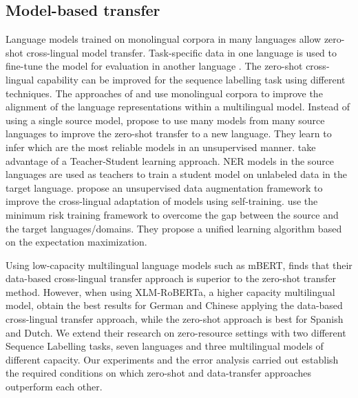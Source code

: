 \documentclass[11pt]{article}
\newcommand{\comment}[1]{#1}
\begin{document}
\subsection{Model-based transfer}
\label{subsec:model_transfer}
Language models trained on monolingual corpora in many languages \cite{DBLP:conf/naacl/DevlinCLT19,xlmr} allow zero-shot cross-lingual model transfer. Task-specific data in one language is used to fine-tune the model for evaluation in another language \cite{pires-etal-2019-multilingual}. The zero-shot cross-lingual capability can be improved for the sequence labelling task using different techniques. 
The approaches of \citet{wang2019cross} and \citet{ouyang2021erniem} use monolingual corpora to improve the alignment of the language representations within a multilingual model.
Instead of using a single source model, \cite{rahimi-etal-2019-massively} propose to use many models from many source languages to improve the zero-shot transfer to a new language. They learn to infer which are the most reliable models in an unsupervised manner. 
\citet{wu-etal-2020-single} take advantage of a Teacher-Student learning approach. NER models in the source languages are used as teachers to train a student model on unlabeled data in the target language. 
\citet{bari2021uxla} propose an unsupervised data augmentation framework to improve the cross-lingual adaptation of models using self-training. 
\citet{hu-etal-2021-risk} use the minimum risk training framework to overcome the gap between the source and the target
languages/domains. They propose a unified learning algorithm based on the expectation maximization.   




Using low-capacity multilingual language models such as mBERT, \citet{fei-etal-2020-cross} finds that their data-based cross-lingual transfer approach is superior to the zero-shot transfer method. However, \citet{Li2021crosslingualNE} when using XLM-RoBERTa, a higher capacity multilingual model, obtain the best results for German and Chinese applying the data-based cross-lingual transfer approach, while the zero-shot approach is best for Spanish and Dutch. We extend their research on zero-resource settings with two different Sequence Labelling tasks, seven languages and three multilingual models of different capacity. Our experiments and the error analysis carried out establish the required conditions on which zero-shot and data-transfer approaches outperform each other. 



\comment{






}
\end{document}
